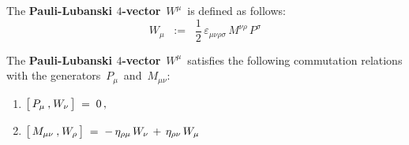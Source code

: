 \vskip 0.5cm
\begin{definition}
\label{DefnPauliLubanskiFourVector}
\mbox{}
\vskip 0.1cm
\noindent
The \textbf{Pauli-Lubanski $4$-vector} \,$W^{\mu}$\, is defined as follows:
\begin{equation*}
W_{\mu}
\;\; := \;\;
	\dfrac{1}{2}\,\varepsilon_{\mu\nu\rho\sigma}\,M^{\nu\rho}\,P^{\sigma}
\end{equation*}
\end{definition}

\vskip 0.5cm
\begin{proposition}
\label{CommRelationsPauliLubanski}
\mbox{}
\vskip 0.1cm
\noindent
The \textbf{Pauli-Lubanski $4$-vector} \,$W^{\mu}$\,
satisfies the following commutation relations with the generators
\,$P_{\mu}$\, and \,$M_{\mu\nu}$:
\begin{enumerate}
\item
	$
	\left[\,
		P_{\mu}
		\,\overset{{\color{white}1}}{,}\,
		W_{\nu}
		\,\right]
	\; = \;
		0\,,
	$
\item
	$
	\left[\,
		M_{\mu\nu}
		\,\overset{{\color{white}1}}{,}\,
		W_{\rho}
		\,\right]
	\; = \;
		-\,
		\eta_{\rho\mu}\,W_{\nu}
		\,+\,
		\eta_{\rho\nu}\,W_{\mu}
	$
\end{enumerate}
\end{proposition}
\proof
